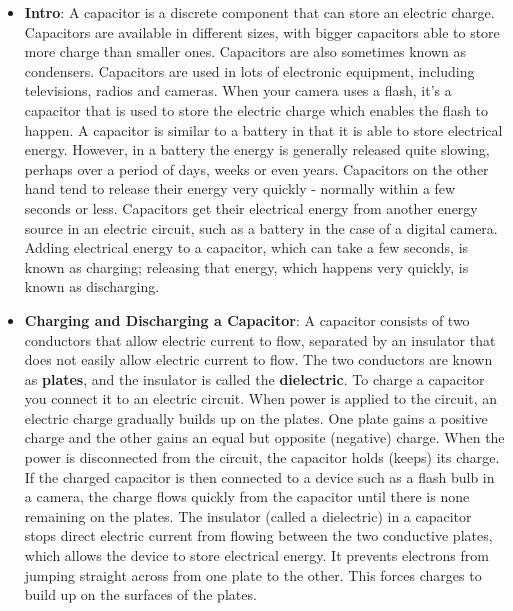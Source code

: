 \documentclass{report}
\begin{document}
    \pagebreak 
    \begin{itemize}
        \item \textbf{Intro}: A capacitor is a discrete component that can store an electric charge. Capacitors are available in different sizes, with bigger capacitors able to store more charge than smaller ones. Capacitors are also sometimes known as condensers.
            \bigbreak \noindent 
            Capacitors are used in lots of electronic equipment, including televisions, radios and cameras. When your camera uses a flash, it's a capacitor that is used to store the electric charge which enables the flash to happen.
            \bigbreak \noindent 
            A capacitor is similar to a battery in that it is able to store electrical energy. However, in a battery the energy is generally released quite slowing, perhaps over a period of days, weeks or even years. Capacitors on the other hand tend to release their energy very quickly - normally within a few seconds or less.
            \bigbreak \noindent 
            Capacitors get their electrical energy from another energy source in an electric circuit, such as a battery in the case of a digital camera. Adding electrical energy to a capacitor, which can take a few seconds, is known as charging; releasing that energy, which happens very quickly, is known as discharging.
        \item \textbf{Charging and Discharging a Capacitor}: A capacitor consists of two conductors that allow electric current to flow, separated by an insulator that does not easily allow electric current to flow. The two conductors are known as \textbf{plates}, and the insulator is called the \textbf{dielectric}.
            \bigbreak \noindent 
            \bigbreak \noindent 
            To charge a capacitor you connect it to an electric circuit. When power is applied to the circuit, an electric charge gradually builds up on the plates. One plate gains a positive charge and the other gains an equal but opposite (negative) charge. When the power is disconnected from the circuit, the capacitor holds (keeps) its charge. If the charged capacitor is then connected to a device such as a flash bulb in a camera, the charge flows quickly from the capacitor until there is none remaining on the plates.
            \bigbreak \noindent 
            The insulator (called a dielectric) in a capacitor stops direct electric current from flowing between the two conductive plates, which allows the device to store electrical energy. It prevents electrons from jumping straight across from one plate to the other. This forces charges to build up on the surfaces of the plates.

\end{itemize}
\end{document}

